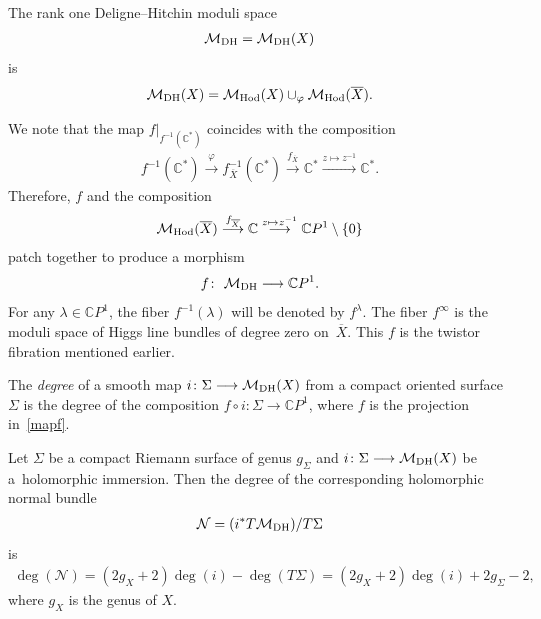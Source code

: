 \begin{Definition}\label{de1} The rank one Deligne--Hitchin moduli space \begin{gather*}{\mathcal M}_{\rm DH} = {\mathcal M}_{\rm DH}(X)\end{gather*} is
\begin{gather*}{\mathcal M}_{\rm DH}(X) = \mathcal M_{\rm Hod}(X)\cup_\varphi\mathcal M_{\rm Hod}(\overline{X}).\end{gather*}
\end{Definition}

We note that the map $f\vert_{f^{-1}({\mathbb C}^*)}$ coincides with the composition
\begin{gather*}
f^{-1}({\mathbb C}^*) \stackrel{\varphi}{\longrightarrow} f^{-1}_{\overline X}({\mathbb C}^*) \stackrel{f_{\overline X}}{\longrightarrow}
 {\mathbb C}^* \stackrel{z\mapsto z^{-1}}{\longrightarrow} {\mathbb C}^* .
\end{gather*}
Therefore, $f$ and the composition
\begin{gather*}
\mathcal M_{\rm Hod}(\overline{X}) \stackrel{f_{\overline X}}{\longrightarrow}  {\mathbb C} \stackrel{z\mapsto z^{-1}}{\longrightarrow}
{\mathbb C}P^1\setminus\{0\}
\end{gather*}
patch together to produce a morphism
\begin{gather}\label{mapf}
f \colon \ {\mathcal M}_{\rm DH} \longrightarrow \mathbb CP^1 .
\end{gather}
For any $\lambda \in \mathbb CP^1$, the f\/iber $f^{-1}(\lambda)$ will be denoted by $f^\lambda$. The f\/iber $f^{\infty}$ is the moduli space of Higgs line bundles of degree zero on~$\overline X$. This $f$ is the twistor f\/ibration mentioned earlier.

\begin{Definition} The {\it degree} of a smooth map $i \colon \Sigma \longrightarrow {\mathcal M}_{\rm DH}(X)$ from a compact oriented surface $\Sigma$ is the degree of the composition $f\circ i \colon \Sigma \longrightarrow {\mathbb C}P^1$, where $f$ is the projection in~\eqref{mapf}.
\end{Definition}

\begin{Lemma}\label{lemdeg} Let $\Sigma$ be a compact Riemann surface of genus $g_\Sigma$ and $i \colon \Sigma \longrightarrow {\mathcal M}_{\rm DH}(X)$ be a~holomorphic immersion. Then the degree of the corresponding holomorphic normal bundle \begin{gather*}{\mathcal N} = (i^*T{\mathcal
M}_{\rm DH})/T\Sigma\end{gather*} is
\begin{gather*}
\deg ({\mathcal N}) = (2 g_X +2)\deg (i)-\deg (T\Sigma) = (2 g_X +2)\deg (i) +2g_\Sigma-2 ,\end{gather*}
where $g_X$ is the genus of $X$.
\end{Lemma}

